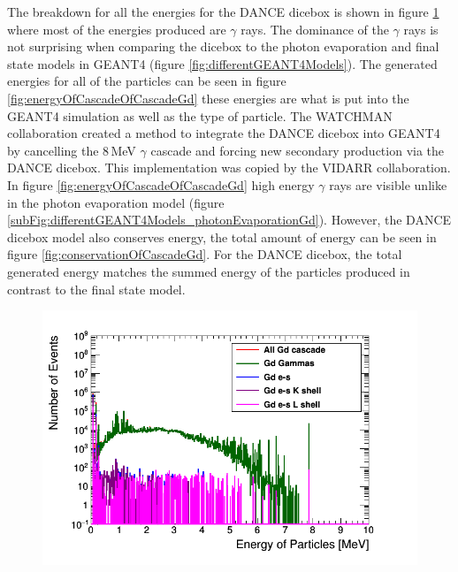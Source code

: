 The breakdown for all the energies for the DANCE dicebox is shown in figure \ref{fig:gadoliniumEnergiesCascade} where most of the energies produced are $\gamma$ rays. The dominance of the $\gamma$ rays is not surprising when comparing the dicebox to the photon evaporation and final state models in GEANT4 (figure \ref{fig:differentGEANT4Models}). The generated energies for all of the particles can be seen in figure \ref{fig:energyOfCascadeOfCascadeGd} these energies are what is put into the GEANT4 simulation as well as the type of particle. The WATCHMAN collaboration created a method to integrate the DANCE dicebox into GEANT4 by cancelling the 8\,MeV $\gamma$ cascade and forcing new secondary production via the DANCE dicebox. This implementation was copied by the VIDARR collaboration. In figure \ref{fig:energyOfCascadeOfCascadeGd} high energy $\gamma$ rays are visible unlike in the photon evaporation model (figure \ref{subFig:differentGEANT4Models_photonEvaporationGd}). However, the DANCE dicebox model also conserves energy, the total amount of energy can be seen in figure  \ref{fig:conservationOfCascadeGd}. For the DANCE dicebox, the total generated energy matches the summed energy of the particles produced in contrast to the final state model. 

\begin{figure}[!h]
 \centering
 \includegraphics[width=0.7\linewidth]{Chapter4/Figs/Raster/gadolinium/gadoliniumEnergiesCascade.png}
 \label{fig:gadoliniumEnergiesCascade}
\end{figure}


